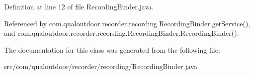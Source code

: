 Definition at line 12 of file Recording\-Binder.\-java.



Referenced by com.\-qualoutdoor.\-recorder.\-recording.\-Recording\-Binder.\-get\-Service(), and com.\-qualoutdoor.\-recorder.\-recording.\-Recording\-Binder.\-Recording\-Binder().



The documentation for this class was generated from the following file\-:\begin{DoxyCompactItemize}
\item 
src/com/qualoutdoor/recorder/recording/Recording\-Binder.\-java\end{DoxyCompactItemize}
